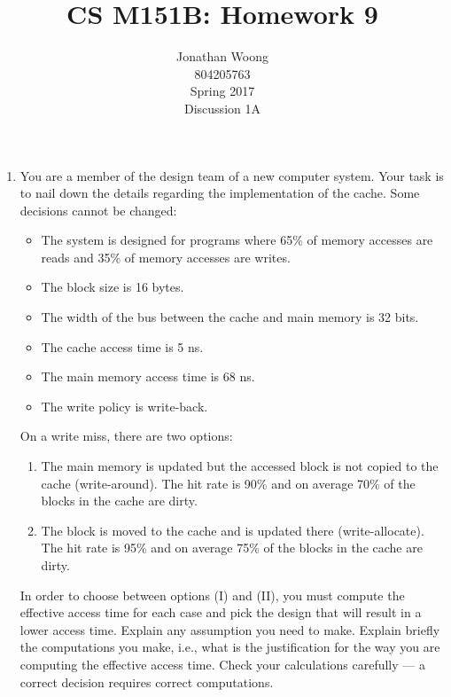 \documentclass[10pt,letterpaper]{article}
\date{\displaydate{date}}
\begin{document}
\title{CS M151B: Homework 9}
\author{
	Jonathan Woong\\
	804205763\\
	Spring 2017\\
	Discussion 1A}
\maketitle
\pagebreak


\begin{enumerate}[label=\textbf{Problem \arabic*.}]
\item You are a member of the design team of a new computer system. Your task is to nail down the details regarding the implementation of the cache. Some decisions cannot be changed:
	\begin{itemize}
	\item The system is designed for programs where 65\% of memory accesses are reads and 35\% of memory accesses are writes.
	\item The block size is 16 bytes.
	\item The width of the bus between the cache and main memory is 32 bits.
	\item The cache access time is 5 ns.
	\item The main memory access time is 68 ns.
	\item The write policy is write-back.
	\end{itemize}
On a write miss, there are two options:
	\begin{enumerate}[label=(\Roman*)]
	\item The main memory is updated but the accessed block is not copied to the cache (write-around). The hit rate is 90\% and on average 70\% of the blocks in the cache are dirty. 
	\item The block is moved to the cache and is updated there (write-allocate). The hit rate is 95\% and on average 75\% of the blocks in the cache are dirty.
	\end{enumerate}
In order to choose between options (I) and (II), you must compute the effective access time for each case and pick the design that will result in a lower access time. Explain any assumption you need to make. Explain briefly the computations you make, i.e., what is the justification for the way you are computing the effective access time. Check your calculations carefully — a correct decision requires correct computations.
	\begin{enumerate}[label=(\Roman*)]

\end{enumerate}
\end{enumerate}
\end{document}

